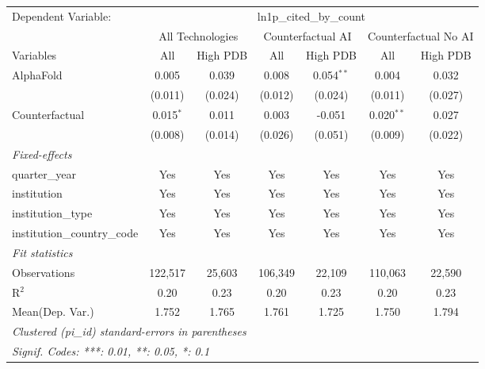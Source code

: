 \begingroup
\centering
\begin{tabular}{lcccccc}
   \tabularnewline \midrule \midrule
   Dependent Variable: & \multicolumn{6}{c}{ln1p\_cited\_by\_count}\\
 & \multicolumn{2}{c}{All Technologies} & \multicolumn{2}{c}{Counterfactual AI} & \multicolumn{2}{c}{Counterfactual No AI} \\
\cmidrule(lr){1-1}\cmidrule(lr){2-3} \cmidrule(lr){4-5} \cmidrule(lr){6-7}
Variables & \multicolumn{1}{c}{All} & \multicolumn{1}{c}{High PDB} & \multicolumn{1}{c}{All} & \multicolumn{1}{c}{High PDB} & \multicolumn{1}{c}{All} & \multicolumn{1}{c}{High PDB} \\
\cmidrule(lr){1-1}\cmidrule(lr){2-2} \cmidrule(lr){3-3} \cmidrule(lr){4-4} \cmidrule(lr){5-5} \cmidrule(lr){6-6} \cmidrule(lr){7-7}
   AlphaFold                    & 0.005       & 0.039   & 0.008   & 0.054$^{**}$ & 0.004        & 0.032\\   
                                & (0.011)     & (0.024) & (0.012) & (0.024)      & (0.011)      & (0.027)\\   
   Counterfactual               & 0.015$^{*}$ & 0.011   & 0.003   & -0.051       & 0.020$^{**}$ & 0.027\\   
                                & (0.008)     & (0.014) & (0.026) & (0.051)      & (0.009)      & (0.022)\\   
   \midrule
   \emph{Fixed-effects}\\
   quarter\_year                & Yes         & Yes     & Yes     & Yes          & Yes          & Yes\\  
   institution                  & Yes         & Yes     & Yes     & Yes          & Yes          & Yes\\  
   institution\_type            & Yes         & Yes     & Yes     & Yes          & Yes          & Yes\\  
   institution\_country\_code   & Yes         & Yes     & Yes     & Yes          & Yes          & Yes\\  
   \midrule
   \emph{Fit statistics}\\
   Observations                 & 122,517     & 25,603  & 106,349 & 22,109       & 110,063      & 22,590\\  
   R$^2$                        & 0.20        & 0.23    & 0.20    & 0.23         & 0.20         & 0.23\\  
Mean(Dep. Var.) & 1.752 & 1.765 & 1.761 & 1.725 & 1.750 & 1.794 \\
   \midrule \midrule
   \multicolumn{7}{l}{\emph{Clustered (pi\_id) standard-errors in parentheses}}\\
   \multicolumn{7}{l}{\emph{Signif. Codes: ***: 0.01, **: 0.05, *: 0.1}}\\
\end{tabular}
\par\endgroup
